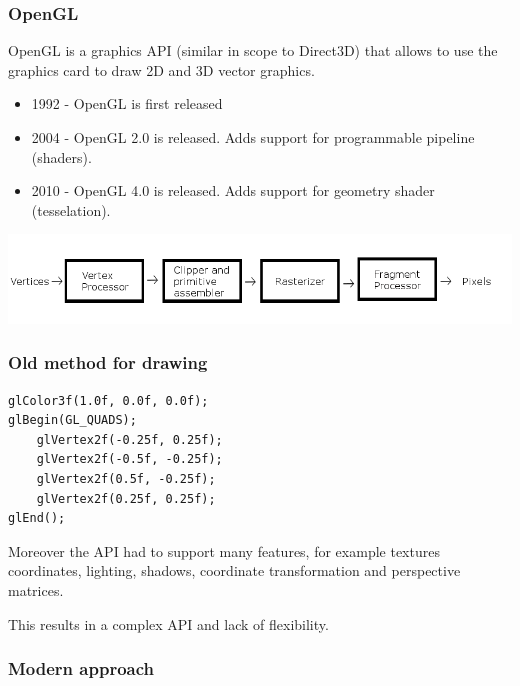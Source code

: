 \begin{frame}

\frametitle{OpenGL}

OpenGL is a graphics API (similar in scope to Direct3D) that allows to use the
graphics card to draw 2D and 3D vector graphics.

\begin{itemize}
    \item{1992 - OpenGL is first released}
    \item{2004 - OpenGL 2.0 is released. Adds support for programmable pipeline (shaders).}
    \item{2010 - OpenGL 4.0 is released. Adds support for geometry shader (tesselation).}
\end{itemize}

\begin{center}
    \includegraphics[width=\textwidth]{images/pipeline.png}
\end{center}

\end{frame}

\begin{frame}[fragile]

\frametitle{Old method for drawing}

\begin{center}
\begin{lstlisting}
glColor3f(1.0f, 0.0f, 0.0f);
glBegin(GL_QUADS);
    glVertex2f(-0.25f, 0.25f);
    glVertex2f(-0.5f, -0.25f);
    glVertex2f(0.5f, -0.25f);
    glVertex2f(0.25f, 0.25f);
glEnd();
\end{lstlisting}
\end{center}

Moreover the API had to support many features, for example textures coordinates,
lighting, shadows, coordinate transformation and perspective matrices.

\vspace{5mm}

This results in a complex API and lack of flexibility.

\end{frame}

\begin{frame}[fragile]

\frametitle{Modern approach}



\end{frame}


